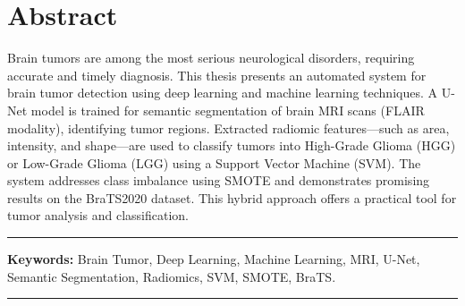 \chapter*{\hfill Abstract \hfill}

Brain tumors are among the most serious neurological disorders, requiring accurate and timely diagnosis. This thesis presents an automated system for brain tumor detection using deep learning and machine learning techniques. A U-Net model is trained for semantic segmentation of brain MRI scans (FLAIR modality), identifying tumor regions. Extracted radiomic features—such as area, intensity, and shape—are used to classify tumors into High-Grade Glioma (HGG) or Low-Grade Glioma (LGG) using a Support Vector Machine (SVM). The system addresses class imbalance using SMOTE and demonstrates promising results on the BraTS2020 dataset. This hybrid approach offers a practical tool for tumor analysis and classification.

\noindent\rule{\textwidth}{0.2pt}
\textbf{Keywords:} Brain Tumor, Deep Learning, Machine Learning, MRI, U-Net, Semantic Segmentation, Radiomics, SVM, SMOTE, BraTS.\\
\noindent\rule{\textwidth}{0.2pt}
